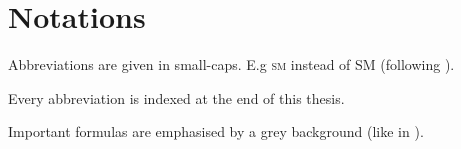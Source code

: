 \documentclass[../../index.tex]{subfiles}
\begin{document}
\chapter*{Notations}

\begin{description}
  \item Abbreviations are given in small-caps. E.g \textsc{sm} instead of SM (following
    \cite{Boito2011}).
  \item Every abbreviation is indexed at the end of this thesis.
  \item Important formulas are emphasised by a grey background (like in \cite{Schwartz2013}). 
\end{description}
\end{document}
